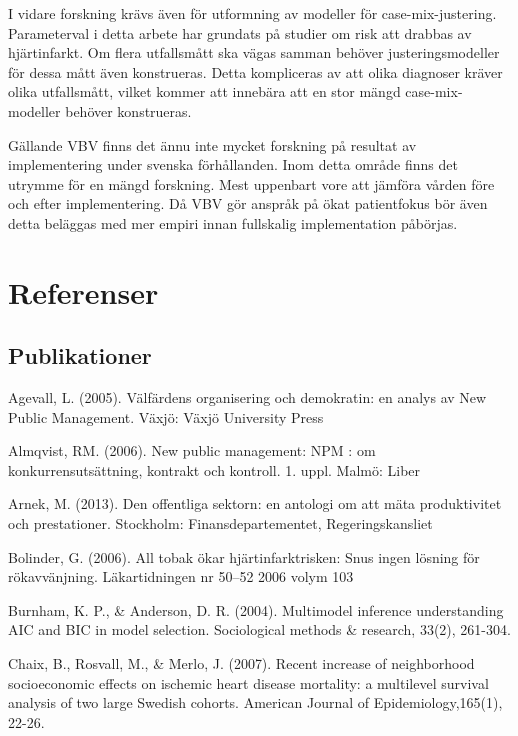 I vidare forskning krävs även för utformning av modeller för case-mix-justering. Parameterval i detta arbete har grundats på studier om risk att drabbas av hjärtinfarkt. Om flera utfallsmått ska vägas samman behöver justeringsmodeller för dessa mått även konstrueras. Detta kompliceras av att olika diagnoser kräver olika utfallsmått, vilket kommer att innebära att en stor mängd case-mix-modeller behöver konstrueras.

Gällande VBV finns det ännu inte mycket forskning på resultat av implementering under svenska förhållanden. Inom detta område finns det utrymme för en mängd forskning. Mest uppenbart vore att jämföra vården före och efter implementering. Då VBV gör anspråk på ökat patientfokus bör även detta beläggas med mer empiri innan fullskalig implementation påbörjas.

\section{Referenser}
\setlength{\parindent}{0cm}

\subsection{Publikationer}

Agevall, L. (2005). Välfärdens organisering och demokratin: en analys av New Public Management. Växjö: Växjö University Press\newline

Almqvist, RM. (2006). New public management: NPM : om konkurrensutsättning, kontrakt och kontroll. 1. uppl. Malmö: Liber		\newline
	
Arnek, M. (2013). Den offentliga sektorn: en antologi om att mäta produktivitet och prestationer. Stockholm: Finansdepartementet, Regeringskansliet\newline

Bolinder, G. (2006). All tobak ökar hjärtinfarktrisken: Snus ingen lösning för rökavvänjning. Läkartidningen nr 50–52 2006 volym 103\newline

Burnham, K. P., \& Anderson, D. R. (2004). Multimodel inference understanding AIC and BIC in model selection. Sociological methods \& research, 33(2), 261-304.\newline

Chaix, B., Rosvall, M., \& Merlo, J. (2007). Recent increase of neighborhood socioeconomic effects on ischemic heart disease mortality: a multilevel survival analysis of two large Swedish cohorts. American Journal of Epidemiology,165(1), 22-26.\newline

